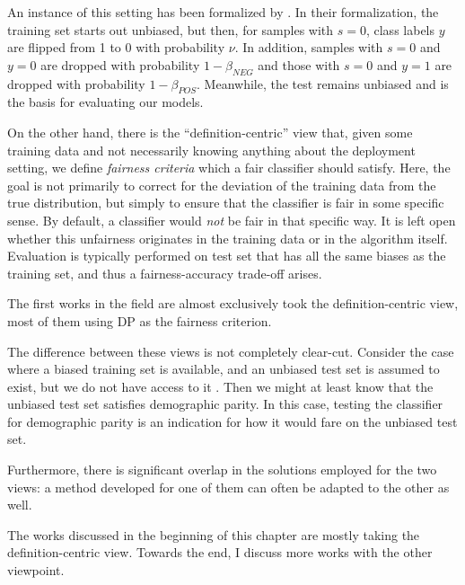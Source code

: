 
An instance of this setting has been formalized by \citet{blum2020recovering}.
In their formalization, the training set starts out unbiased,
but then, for samples with \(s=0\), class labels \(y\) are flipped from 1 to 0 with probability \(\nu\).
In addition, samples with \(s=0\) and \(y=0\) are dropped with probability \(1-\beta_\mathit{NEG}\)
and those with \(s=0\) and \(y=1\) are dropped with probability \(1-\beta_\mathit{POS}\).
Meanwhile, the test remains unbiased and is the basis for evaluating our models.

On the other hand, there is the ``definition-centric'' view that,
given some training data and not necessarily knowing anything about the deployment setting,
we define \emph{fairness criteria} which a fair classifier should satisfy.
Here, the goal is not primarily to correct for the deviation of the training data from the true distribution,
but simply to ensure that the classifier is fair in some specific sense.
By default, a classifier would \emph{not} be fair in that specific way.
It is left open whether this unfairness originates in the training data or in the algorithm itself.
Evaluation is typically performed on test set that has all the same biases as the training set,
and thus a fairness-accuracy trade-off arises.

The first works in the field are almost exclusively took the definition-centric view,
most of them using \acf{DP} \citep{dwork2012fairness} as the fairness criterion.

The difference between these views is not completely clear-cut.
Consider the case where a biased training set is available,
and an unbiased test set is assumed to exist, but we do not have access to it \citep{jiang2020identifying}.
Then we might at least know that the unbiased test set satisfies demographic parity.
In this case, testing the classifier for demographic parity is an indication
for how it would fare on the unbiased test set.

Furthermore, there is significant overlap in the solutions employed for the two views:
a method developed for one of them can often be adapted to the other as well.

The works discussed in the beginning of this chapter are mostly taking the definition-centric view.
Towards the end, I discuss more works with the other viewpoint.

